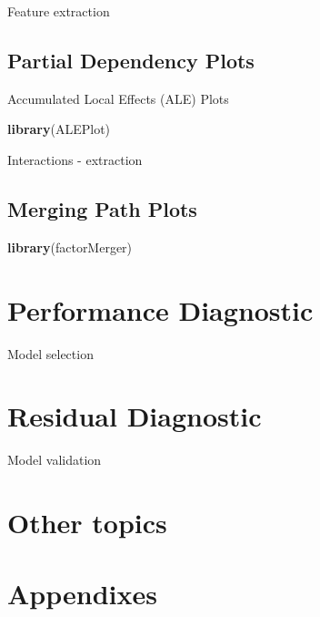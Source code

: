 \documentclass[]{book}
\newenvironment{Shaded}{\begin{snugshade}}{\end{snugshade}}
\newcommand{\KeywordTok}[1]{\textcolor[rgb]{0.13,0.29,0.53}{\textbf{#1}}}
\newcommand{\NormalTok}[1]{#1}
\theoremstyle{definition}
\theoremstyle{definition}
\theoremstyle{definition}
\theoremstyle{remark}
\begin{document}
Feature extraction

\hypertarget{partial-dependency-plots}{%
\section{Partial Dependency Plots}\label{partial-dependency-plots}}

Accumulated Local Effects (ALE) Plots

\citep{R-ALEPlot}

\begin{Shaded}
\begin{Highlighting}[]
\KeywordTok{library}\NormalTok{(ALEPlot)}
\end{Highlighting}
\end{Shaded}

Interactions - extraction

\hypertarget{merging-path-plots}{%
\section{Merging Path Plots}\label{merging-path-plots}}

\citep{R-factorMerger}

\begin{Shaded}
\begin{Highlighting}[]
\KeywordTok{library}\NormalTok{(factorMerger)}
\end{Highlighting}
\end{Shaded}

\hypertarget{performance-diagnostic}{%
\chapter{Performance Diagnostic}\label{performance-diagnostic}}

Model selection

\hypertarget{residual-diagnostic}{%
\chapter{Residual Diagnostic}\label{residual-diagnostic}}

Model validation

\hypertarget{other-topics}{%
\chapter{Other topics}\label{other-topics}}

\hypertarget{appendixes}{%
\chapter*{Appendixes}\label{appendixes}}
\end{document}
